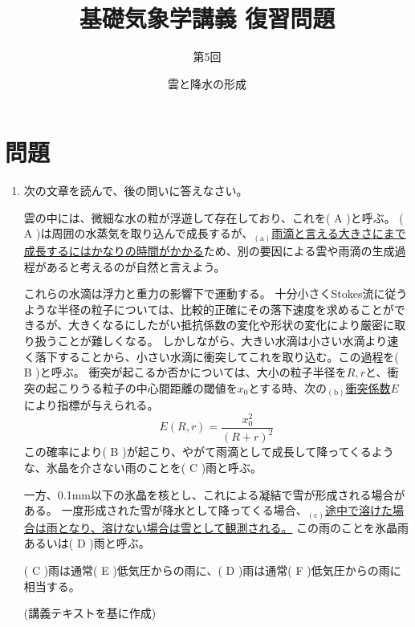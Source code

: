 \documentclass{jsarticle}
\newenvironment{problems}
{
  \renewcommand\labelenumi{\doublebox{\arabic{enumi}}}
  \begin{enumerate}
}{
  \end{enumerate}
  \renewcommand\labelenumi{\arabic{enumi}.}
}
\begin{document}
\title{基礎気象学講義 復習問題} %
\author{第5回} %
\date{雲と降水の形成} %
\maketitle

\section{問題}

    \begin{problems}
    \item 次の文章を読んで、後の問いに答えなさい。
        \begin{screen}

          雲の中には、微細な水の粒が浮遊して存在しており、これを( A )と呼ぶ。
          ( A )は周囲の水蒸気を取り込んで成長するが、$_{(\mathrm{a})}$\underline{雨滴と言える大きさにまで成長するにはかなりの時間がかかる}ため、別の要因による雲や雨滴の生成過程があると考えるのが自然と言えよう。

          これらの水滴は浮力と重力の影響下で運動する。
          十分小さくStokes流に従うような半径の粒子については、比較的正確にその落下速度を求めることができるが、大きくなるにしたがい抵抗係数の変化や形状の変化により厳密に取り扱うことが難しくなる。
          しかしながら、大きい水滴は小さい水滴より速く落下することから、小さい水滴に衝突してこれを取り込む。この過程を( B )と呼ぶ。
          衝突が起こるか否かについては、大小の粒子半径を$R,r$と、衝突の起こりうる粒子の中心間距離の閾値を$x_0$とする時、次の$_{(\mathrm{b})}$\underline{衝突係数}$E$により指標が与えられる。
          \[ E(R,r) =\frac{x_0^2}{(R+r)^2} \]
          この確率により( B )が起こり、やがて雨滴として成長して降ってくるような、氷晶を介さない雨のことを( C )雨と呼ぶ。

          一方、0.1mm以下の氷晶を核とし、これによる凝結で雪が形成される場合がある。
          一度形成された雪が降水として降ってくる場合、$_{(\mathrm{c})}$\underline{途中で溶けた場合は雨となり、溶けない場合は雪として観測される。}
          この雨のことを氷晶雨あるいは( D )雨と呼ぶ。
          
          ( C )雨は通常( E )低気圧からの雨に、( D )雨は通常( F )低気圧からの雨に相当する。

            \begin{flushright}
            (講義テキストを基に作成)
            \end{flushright}
        \end{screen}


\end{problems}
\end{document}
